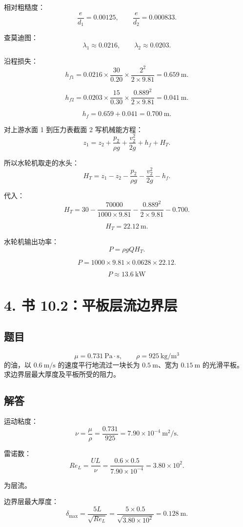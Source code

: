 ﻿\documentclass[11pt,a4paper]{ctexart}
\begin{document}
相对粗糙度：
\[
\frac{e}{d_1}=0.00125,\qquad
\frac{e}{d_2}=0.000833.
\]

查莫迪图：
\[
\lambda_1\approx0.0216,\qquad
\lambda_2\approx0.0203.
\]

沿程损失：
\[
h_{f1}
=0.0216\times\frac{30}{0.20}\times\frac{2^2}{2\times9.81}
=0.659\ \mathrm{m}.
\]

\[
h_{f2}
=0.0203\times\frac{15}{0.30}\times\frac{0.889^2}{2\times9.81}
=0.041\ \mathrm{m}.
\]

\[
h_f=0.659+0.041=0.700\ \mathrm{m}.
\]

对上游水面 1 到压力表截面 2 写机械能方程：
\[
z_1=z_2+\frac{p_2}{\rho g}+\frac{v_2^2}{2g}+h_f+H_T.
\]

所以水轮机取走的水头：
\[
H_T=z_1-z_2-\frac{p_2}{\rho g}-\frac{v_2^2}{2g}-h_f.
\]

代入：
\[
H_T=30-\frac{70000}{1000\times9.81}
-\frac{0.889^2}{2\times9.81}
-0.700.
\]

\[
H_T=22.12\ \mathrm{m}.
\]

水轮机输出功率：
\[
P=\rho gQH_T.
\]

\[
P=1000\times9.81\times0.0628\times22.12.
\]

\[
\boxed{P\approx13.6\ \mathrm{kW}}
\]

\section*{4. 书 10.2：平板层流边界层}

\subsection*{题目}

\[
\mu=0.731\ \mathrm{Pa\cdot s},\qquad \rho=925\ \mathrm{kg/m^3}
\]
的油，以 \(0.6\ \mathrm{m/s}\) 的速度平行地流过一块长为 \(0.5\ \mathrm{m}\)、宽为 \(0.15\ \mathrm{m}\) 的光滑平板。求边界层最大厚度及平板所受的阻力。

\subsection*{解答}

运动粘度：
\[
\nu=\frac{\mu}{\rho}=\frac{0.731}{925}
=7.90\times10^{-4}\ \mathrm{m^2/s}.
\]

雷诺数：
\[
Re_L=\frac{UL}{\nu}
=\frac{0.6\times0.5}{7.90\times10^{-4}}
=3.80\times10^2.
\]

为层流。

边界层最大厚度：
\[
\delta_{\max}=\frac{5L}{\sqrt{Re_L}}
=\frac{5\times0.5}{\sqrt{3.80\times10^2}}
=0.128\ \mathrm{m}.
\]
\end{document}
